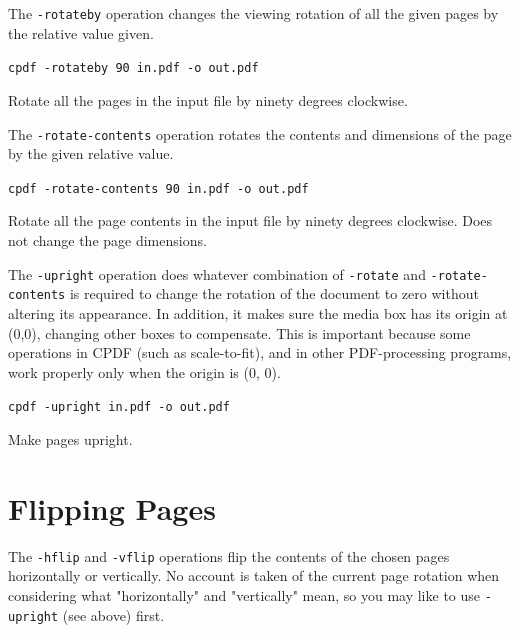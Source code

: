 \documentclass{book}
\begin{document}
  \noindent The \texttt{-rotateby} operation changes the viewing rotation of all the
given pages by the relative value given.

  \begin{framed}
  \noindent\small\verb!cpdf -rotateby 90 in.pdf -o out.pdf!

  \vspace{2.5mm}
  \noindent Rotate all the pages in the input file by ninety degrees clockwise.
  \end{framed}

  \noindent The \texttt{-rotate-contents} operation rotates the contents and dimensions
of the page by the given relative value.

  \begin{framed}
  \noindent\small\verb!cpdf -rotate-contents 90 in.pdf -o out.pdf!

  \vspace{2.5mm}

  \noindent Rotate all the page contents in the input file by
ninety degrees clockwise. Does not change the page dimensions.
  \end{framed}

  \label{upright}
   \noindent The \texttt{-upright} operation does whatever combination of
\texttt{-rotate} and \texttt{-rotate-contents} is required to change the
rotation of the document to zero without altering its appearance. In addition, it makes sure the media box has its origin at (0,0), changing other boxes to compensate. This is important because some operations in CPDF (such as scale-to-fit), and in other PDF-processing programs, work properly only when the origin is (0, 0).

  \begin{framed}
  \noindent\small\verb!cpdf -upright in.pdf -o out.pdf!

  \vspace{2.5mm}

  \noindent Make pages upright.
  \end{framed}

  \section{Flipping Pages}
  The \texttt{-hflip} and \texttt{-vflip} operations flip the contents of the
chosen pages horizontally or vertically. No account is taken of the current
page rotation when considering what "horizontally" and "vertically" mean, so you may like to use \texttt{-upright} (see above) first.
\end{document}
